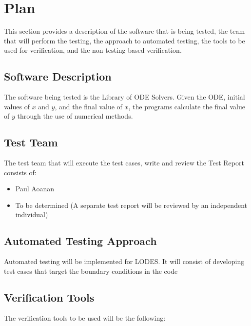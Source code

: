 \documentclass[12pt, titlepage]{article}
\newcommand{\famname}{LODES} %
\newcommand{\famdesc}{Library of ODE Solvers}
\begin{document}
\section{Plan}
This section provides a description of the software that is being tested, the team that will
perform the testing, the approach to automated testing, the tools to be used for verification, and the non-testing based verification. 
	
\subsection{Software Description}
The software being tested is the \famdesc{}. Given the ODE, initial values of $x$ and $y$, and the final value of $x$,
the programs calculate the final value of $y$ through the use of numerical methods.

\subsection{Test Team}

The test team that will execute the test cases, write and review the Test Report consists of:
\begin{itemize}
 \item Paul Aoanan
 \item To be determined (A separate test report will be reviewed by an independent individual)
\end{itemize} 

\subsection{Automated Testing Approach}
Automated testing will be implemented for \famname{}. It will consist of developing test cases that target the boundary conditions in the code 

\subsection{Verification Tools}
The verification tools to be used will be the following:
\end{document}
